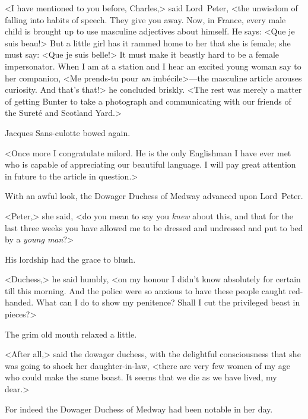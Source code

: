 <I have mentioned to you before, Charles,> said Lord~Peter, <the unwisdom of falling into habits of speech. They give you away. Now, in France, every male child is brought up to use masculine adjectives about himself. He says: <\textfrench{Que je suis beau!}> But a little girl has it rammed home to her that she is female; she must say: <\textfrench{Que je suis belle!}> It must make it beastly hard to be a female impersonator. When I am at a station and I hear an excited young woman say to her companion, <Me prends-tu pour \emph{un} imbécile>—the masculine article arouses curiosity. And that's that!> he concluded briskly. <The rest was merely a matter of getting Bunter to take a photograph and communicating with our friends of the Sureté and Scotland Yard.>

Jacques Sans-culotte bowed again.

<Once more I congratulate milord. He is the only Englishman I have ever met who is capable of appreciating our beautiful language. I will pay great attention in future to the article in question.>

With an awful look, the Dowager Duchess of Medway advanced upon Lord~Peter.

<Peter,> she said, <do you mean to say you \emph{knew} about this, and that for the last three weeks you have allowed me to be dressed and undressed and put to bed by a \emph{young man}?>

His lordship had the grace to blush.

<Duchess,> he said humbly, <on my honour I didn't know absolutely for certain till this morning. And the police were so anxious to have these people caught red-handed. What can I do to show my penitence? Shall I cut the privileged beast in pieces?>

The grim old mouth relaxed a little.

<After all,> said the dowager duchess, with the delightful consciousness that she was going to shock her daughter-in-law, <there are very few women of my age who could make the same boast. It seems that we die as we have lived, my dear.>

For indeed the Dowager Duchess of Medway had been notable in her day.